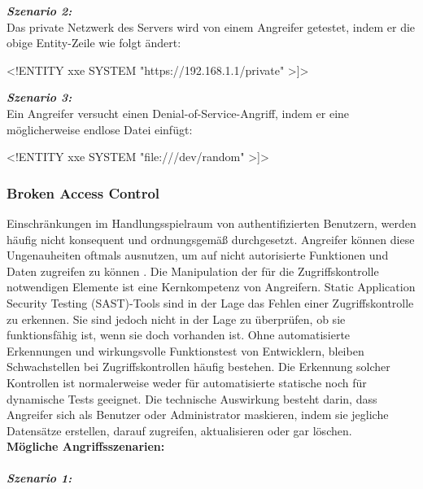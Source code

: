 \textbf{\textit{Szenario 2:}}\\
Das private Netzwerk des Servers wird von einem Angreifer getestet, indem er die obige Entity-Zeile wie folgt ändert\cite[10]{owasp17top10}:\\

\begin{LaTeXCode}[caption={XML-Beispiel 2},captionpos=b, label=LaTeXCode:xxe2][numbers=none]
<!ENTITY xxe SYSTEM "https://192.168.1.1/private" >]>
\end{LaTeXCode}

\textbf{\textit{Szenario 3:}}\\
Ein Angreifer versucht einen Denial-of-Service-Angriff, indem er eine möglicherweise endlose Datei einfügt\cite[10]{owasp17top10}:\\

\begin{LaTeXCode}[caption={XML-Beispiel 3},captionpos=b, label=LaTeXCode:xxe3][numbers=none]
<!ENTITY xxe SYSTEM "file:///dev/random" >]>
\end{LaTeXCode}

\subsubsection{Broken Access Control}

Einschränkungen im Handlungsspielraum von authentifizierten Benutzern, werden häufig nicht konsequent und ordnungsgemäß durchgesetzt. Angreifer können diese Ungenauheiten oftmals ausnutzen, um auf nicht autorisierte Funktionen und Daten zugreifen zu können \cite[6]{owasp17top10}. Die Manipulation der für die Zugriffskontrolle notwendigen Elemente ist eine Kernkompetenz von Angreifern. Static Application Security Testing (SAST)-Tools sind in der Lage das Fehlen einer Zugriffskontrolle zu erkennen. Sie sind jedoch nicht in der Lage zu überprüfen, ob sie funktionsfähig ist, wenn sie doch vorhanden ist. Ohne automatisierte Erkennungen und wirkungsvolle Funktionstest von Entwicklern, bleiben Schwachstellen bei Zugriffskontrollen häufig bestehen. Die Erkennung solcher Kontrollen ist normalerweise weder für automatisierte statische noch für dynamische Tests geeignet. Die technische Auswirkung besteht darin, dass Angreifer sich als Benutzer oder Administrator maskieren, indem sie jegliche Datensätze erstellen, darauf zugreifen, aktualisieren oder gar löschen\cite[11]{owasp17top10}.\\

\textbf{Mögliche Angriffsszenarien:}\\
\\
\textbf{\textit{Szenario 1:}}\\

